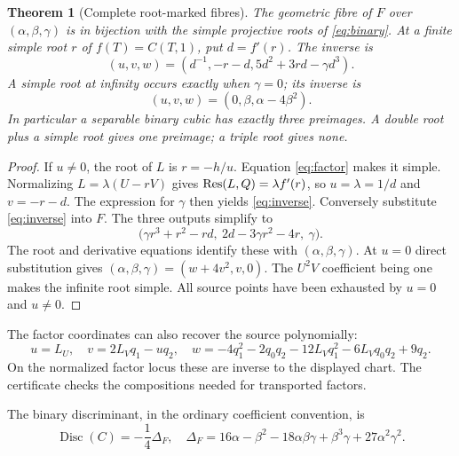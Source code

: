 \documentclass[11pt]{article}
\newtheorem{theorem}{Theorem}[section]
\theoremstyle{remark}\newtheorem{remark}[theorem]{Remark}
\newcommand{\Disc}{\operatorname{Disc}}\newcommand{\tr}{\operatorname{tr}}
\begin{document}
\begin{theorem}[Complete root-marked fibres]\label{thm:fibres}
The geometric fibre of $F$ over $(\alpha,\beta,\gamma)$ is in bijection with the simple projective roots of \eqref{eq:binary}. At a finite simple root $r$ of $f(T)=C(T,1)$, put $d=f'(r)$. The inverse is
\begin{equation}\label{eq:inverse}
 (u,v,w)=\left(d^{-1},-r-d,5d^2+3rd-\gamma d^3\right).
\end{equation}
A simple root at infinity occurs exactly when $\gamma=0$; its inverse is
\[
 (u,v,w)=(0,\beta,\alpha-4\beta^2).
\]
In particular a separable binary cubic has exactly three preimages. A double root plus a simple root gives one preimage; a triple root gives none.
\end{theorem}
\begin{proof}
If $u\ne0$, the root of $L$ is $r=-h/u$. Equation \eqref{eq:factor} makes it simple. Normalizing $L=\lambda(U-rV)$ gives
$\operatorname{Res}(L,Q)=\lambda f'(r)$, so $u=\lambda=1/d$ and $v=-r-d$.
The expression for $\gamma$ then yields \eqref{eq:inverse}. Conversely substitute \eqref{eq:inverse} into $F$. The three outputs simplify to
\[
 \bigl(\gamma r^3+r^2-rd,\ 2d-3\gamma r^2-4r,\ \gamma\bigr).
\]
The root and derivative equations identify these with $(\alpha,\beta,\gamma)$. At $u=0$ direct substitution gives $(\alpha,\beta,\gamma)=(w+4v^2,v,0)$. The $U^2V$ coefficient being one makes the infinite root simple. All source points have been exhausted by $u=0$ and $u\ne0$.
\end{proof}
The factor coordinates can also recover the source polynomially:
\[
 u=L_U,\quad v=2L_Vq_1-uq_2,\quad
 w=-4q_1^2-2q_0q_2-12L_Vq_1^2-6L_Vq_0q_2+9q_2.
\]
On the normalized factor locus these are inverse to the displayed chart. The certificate checks the compositions needed for transported factors.

The binary discriminant, in the ordinary coefficient convention, is
\begin{equation}\label{eq:disc}
 \Disc(C)=-\frac14\Delta_F,\quad
 \Delta_F=16\alpha-\beta^2-18\alpha\beta\gamma
             +\beta^3\gamma+27\alpha^2\gamma^2.
\end{equation}
\end{document}
